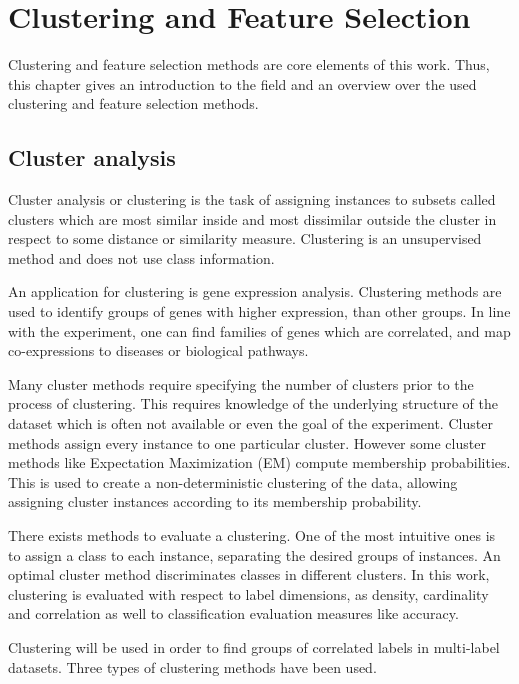 \chapter{Clustering and Feature Selection}
\label{chap:clusteringandfeatureselection}

	Clustering and feature selection methods are core elements of this work. Thus, this chapter gives an introduction to the field and an overview over the used clustering and feature selection methods.

	\section{Cluster analysis}
	\label{sec:clustering}

		Cluster analysis or clustering is the task of assigning instances to subsets called clusters which are most similar inside and most dissimilar outside the cluster in respect to some distance or similarity measure. Clustering is an unsupervised method and does not use class information.

		An application for clustering is gene expression analysis. Clustering methods are used to identify groups of genes with higher expression, than other groups. In line with the experiment, one can find families of genes which are correlated, and map co-expressions to diseases or biological pathways.

		Many cluster methods require specifying the number of clusters prior to the process of clustering. This requires knowledge of the underlying structure of the dataset which is often not available or even the goal of the experiment. Cluster methods assign every instance to one particular cluster. However some cluster methods like Expectation Maximization (EM) compute membership probabilities. This is used to create a non-deterministic clustering of the data, allowing assigning cluster instances according to its membership probability.

		There exists methods to evaluate a clustering. One of the most intuitive ones is to assign a class to each instance, separating the desired groups of instances. An optimal cluster method discriminates classes in different clusters. In this work, clustering is evaluated with respect to label dimensions, as density, cardinality and correlation as well to classification evaluation measures like accuracy.

		Clustering will be used in order to find groups of correlated labels in multi-label datasets. Three types of clustering methods have been used.

